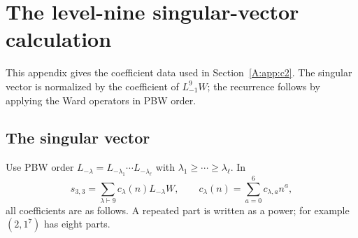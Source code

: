 \documentclass[11pt]{article}
\numberwithin{equation}{section}
\begin{document}
\appendix
\section{The level-nine singular-vector calculation}\label{app:null}
This appendix gives the coefficient data used in Section~\ref{A:app:c2}. The singular vector is normalized by the coefficient of $L_{-1}^9W$; the recurrence follows by applying the Ward operators in PBW order.

\subsection{The singular vector}
Use PBW order $L_{-\lambda}=L_{-\lambda_1}\cdots L_{-\lambda_\ell}$ with $\lambda_1\geq\cdots\geq\lambda_\ell$. In
\[
s_{3,3}=\sum_{\lambda\vdash9}c_\lambda(n)L_{-\lambda}W,\qquad
c_\lambda(n)=\sum_{a=0}^6c_{\lambda,a}n^a,
\]
all coefficients are as follows. A repeated part is written as a power; for example $(2,1^7)$ has eight parts.
\end{document}
